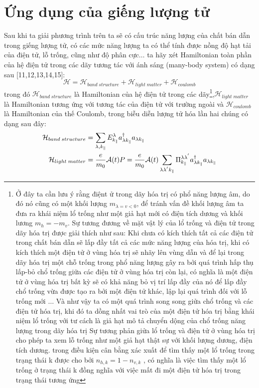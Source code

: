 \section{Ứng dụng của giếng lượng tử}
Sau khi ta giải phương trình trên ta sẽ có cấu trúc năng lượng của chất bán dẫn trong giếng lượng tử, có các mức năng lượng ta có thể tính được nồng độ hạt tải của điện tử, lỗ trống, cũng như độ phân cực$\dots$ ta hãy xét Hamiltonian toàn phần của  hệ điện tử trong các dãy tương tác với ánh sáng (many-body system) có dạng sau [11,12,13,14,15]:   
\begin{equation}
\mathcal{H} = \mathcal{H}_{band \;structure} +\mathcal{H}_{light\;matter} +\mathcal{H}_{coulomb}
\end{equation}
trong đó $\mathcal{H}_{band\;structure}$ là Hamiltonian của hệ điện tử trong các dãy\footnote{Ở đây ta cần lưu ý rằng điệnt ử trong dãy hóa trị có phổ năng lượng âm, do đó nó cũng có một khối lượng $m_{\lambda=v <0}$, để tránh vấn đề khối lượng âm ta đưa ra khái niệm lổ trống như một giả hạt mới có điện tích dương và khối lương  $m_h= -m_v$. Sự tương đương về mặt vật lý của lổ trống và điện tử trong dãy hóa trị được giải thích như sau: Khi chưa có kích thích tất cả các điện tử trong chất bán dẫn sẽ lấp đầy tất cả các mức năng lượng của hóa trị, khi có kích thích một điện tử ở vùng hóa trị sẽ nhãy lên vùng dẫn và để lại trong dãy hóa trị một chỗ trống trong phổ năng lượng gây ra bởi quá trình hấp thụ lấp-bỏ chổ trống giữa các điện tử ở vùng hóa trị còn lại, có nghĩa là một điện tử ở vùng hóa trị bất kỳ sẽ có khả năng bỏ vị trí lấp đầy của nó để lấp đầy chổ trống vừa được tạo ra bởi một điện tử khác, lập lại quá trình đối với lỗ trống mới $\dots$ Và như vậy ta có một quá trình song song giửa chổ trống và các điện tử hóa trị, khi đó ta dồng nhất vai trò của một điện tử hóa trị bằng khái niệm lổ trống với tư cách là giả hạt mô tả chuyển dộng của chổ trống năng lượng trong dãy hóa trị Sự tương phản giửa lổ trống và điện tử ở vùng hóa trị cho phép ta xem lỗ trống như một giả hạt thật sự với khối lượng dương, điện tích dương. trong điều kiện cân bằng xác xuất để tìm thấy một lổ trống trong trạng thái k được cho bởi 
\(n_{h,k}= 1-n_{v,k}\) , có nghĩa là việc tìm thấy một lổ trống ở trạng thái k đồng nghĩa với việc mất đi một điện tử hóa trị trong trạng thái tương ứng },$\mathcal{H}_{light\;matter}$ là Hamiltonian tương ứng với tương tác của điện tử với trường ngoài và $\mathcal{H}_{coulomb}$ là Hamiltonian của thế Coulomb, trong  biễu diễn lượng tử hóa lần hai chúng có dạng sau đây:
\begin{align}
\mathcal{H}_{band\;structure} &= \sum_{\lambda,k_{\parallel}}E_{k_{\parallel}}^{\lambda}a_{\lambda k_{\parallel}}^{\dagger}a_{\lambda k_{\parallel}}\notag\\
\mathcal{H}_{light\;matter} &= \frac{e}{m_0}\mathcal{A}(t)P=\frac{e}{m_0}\mathcal{A}(t)\sum_{\lambda\lambda^{'}k_{\parallel}}\Pi_{k_{\parallel}}^{\lambda\lambda^{'}}
a_{\lambda k_{\parallel}}^{\dagger}a_{\lambda k_{\parallel}}
\end{align} 

